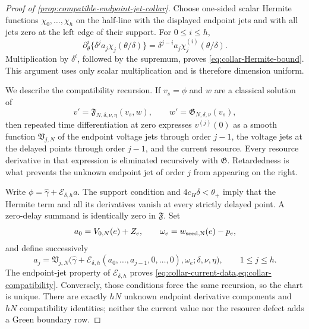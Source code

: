 \begin{proof}[Proof of \cref{prop:compatible-endpoint-jet-collar}]
Choose one-sided scalar Hermite functions \(\chi_0,\ldots,\chi_h\) on the
half-line with the displayed endpoint jets and with all jets zero at the
left edge of their support.
For \(0\le i\le h\),
\[
 \partial_\theta^i
 \{\delta^ja_j\chi_j(\theta/\delta)\}
 =\delta^{j-i}a_j\chi_j^{(i)}(\theta/\delta).
\]
Multiplication by \(\delta^i\), followed by the supremum, proves
\cref{eq:collar-Hermite-bound}.  This argument uses only scalar
multiplication and is therefore dimension uniform.

We describe the compatibility recursion.  If \(v_s=\phi\) and \(w\) are a
classical solution of
\[
 v'=\mathfrak F_{N,\delta,\nu,\eta}(v_s,w),
 \qquad w'=\mathfrak G_{N,\delta,\nu}(v_s),
\]
then repeated time differentiation at zero expresses \(v^{(j)}(0)\) as a
smooth function \(\mathfrak V_{j,N}\) of the endpoint voltage jets through
order \(j-1\), the voltage jets at the delayed points through order \(j-1\),
and the current resource.  Every resource derivative in that expression is
eliminated recursively with \(\mathfrak G\).  Retardedness is what prevents
the unknown endpoint jet of order \(j\) from appearing on the right.

Write \(\phi=\widehat\gamma+\mathcal E_{\delta,h}a\).  The support condition
and \(4c_H\delta<\theta_+\) imply that the Hermite term and all its derivatives
vanish at every strictly delayed point.  A zero-delay summand is identically
zero in \(\mathfrak F\).  Set
\[
 a_0=V_{0,N}(e)+Z_e,\qquad
 \omega_e=w_{\rm seed,N}(e)-p_e,
\]
and define successively
\[
 a_j=\mathfrak V_{j,N}
 \bigl(\widehat\gamma+\mathcal E_{\delta,h}
        (a_0,\ldots,a_{j-1},0,\ldots,0),
       \omega_e;\delta,\nu,\eta\bigr),
 \qquad1\le j\le h.
                                                               \label{eq:collar-jet-recursion}
\]
The endpoint-jet property of \(\mathcal E_{\delta,h}\) proves
\cref{eq:collar-current-data,eq:collar-compatibility}.  Conversely, those
conditions force the same recursion, so the chart is unique.  There are
exactly \(hN\) unknown endpoint derivative components and \(hN\)
compatibility identities; neither the current value nor the resource defect
adds a Green boundary row.


\end{proof}
